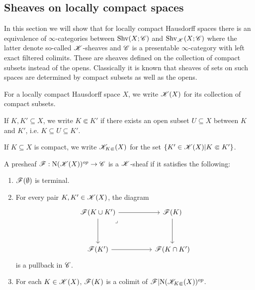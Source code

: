 \documentclass[../thesis.tex]{subfiles}
\begin{document}
\subsection{Sheaves on locally compact spaces}
In this section we will show that for locally compact Hausdorff spaces there is an equivalence of $\infty$-categories between $\mathrm{Shv}(X;\mathscr{C})$ and $\mathrm{Shv}_{\mathscr{K}}(X;\mathscr{C})$ where the latter denote so-called $\mathscr{K}$-sheaves and $\mathscr{C}$ is a presentable $\infty$-category with left exact filtered colimits.
These are sheaves defined on the collection of compact subsets instead of the opens.
Classically it is known that sheaves of sets on such spaces are determined by compact subsets as well as the opens.
\begin{definition}
    For a locally compact Hausdorff space $X$, we write $\mathscr{K}(X)$ for its collection of compact subsets.
\end{definition}
\begin{definition}
    If $K, K' \subseteq X$, we write $K \Subset K'$ if there exists an open subset $U\subseteq X$ between $K$ and $K'$, i.e. $K \subseteq U \subseteq K'$.
\end{definition}
\begin{definition}
    If $K\subseteq X$ is compact, we write $\mathscr{K}_{K\Subset}(X)$ for the set $\{ K'\in \mathscr{K}(X) | K \Subset K' \}$.
\end{definition}
\begin{definition}
    A presheaf $\mathscr{F}:\mathrm{N}(\mathscr{K}(X))^{op}\to \mathscr{C}$ is a $\mathscr{K}$-sheaf if it satisfies the following:
    \begin{enumerate}
        \item $\mathscr{F}(\emptyset)$ is terminal.
        \item For every pair $K,K'\in \mathscr{K}(X)$, the diagram
              \[\begin{tikzcd}
                      {\F(K \cup K')} && {\F(K)} \\
                      \\
                      {\F(K')} && {\F(K\cap K')}
                      \arrow[from=1-3, to=3-3]
                      \arrow[from=3-1, to=3-3]
                      \arrow[from=1-1, to=3-1]
                      \arrow["\lrcorner"{anchor=center, pos=0.125}, draw=none, from=1-1, to=3-3]
                      \arrow[from=1-1, to=1-3]
                  \end{tikzcd}\]
              is a pullback in $\mathscr{C}$.
        \item For each $K\in \mathscr{K}(X)$, $\mathscr{F}(K)$ is a colimit of $\mathscr{F}|\mathrm{N}(\mathscr{K}_{K\Subset}(X))^{op}$.
    \end{enumerate}
\end{definition}
\end{document}

